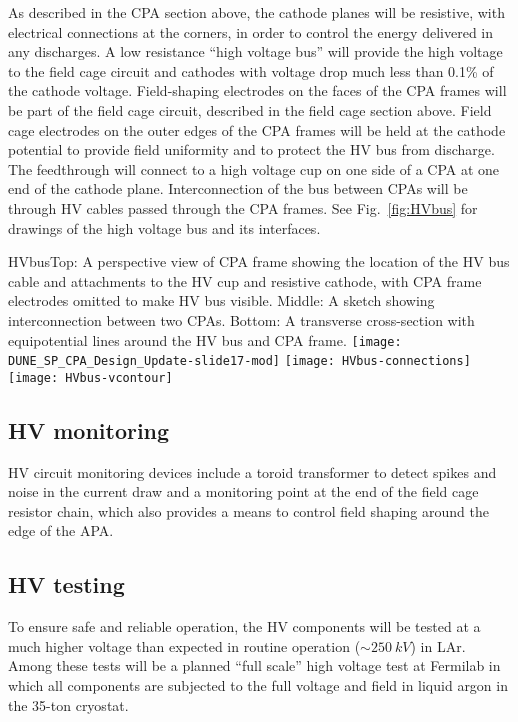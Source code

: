 As described in the CPA section above, the cathode planes will be
resistive, with electrical connections at the corners, in order to
control the energy delivered in any discharges.  A low resistance
``high voltage bus'' will provide the high voltage to the field cage
circuit and cathodes with voltage drop much less than 0.1\% of the
cathode voltage.  Field-shaping electrodes on the faces of the CPA
frames will be part of the field cage circuit, described in the field
cage section above. Field cage electrodes on the outer edges of the
CPA frames will be held at the cathode potential to provide field
uniformity and to protect the HV bus from discharge.  The feedthrough
will connect to a high voltage cup on one side of a CPA at one end of
the cathode plane.  Interconnection of the bus between CPAs will be
through HV cables passed through the CPA frames.  See
Fig.~\ref{fig:HVbus} for drawings of the high voltage bus and its
interfaces.

\begin{cdrfigure}{HVbus}{Top: A perspective view of CPA frame showing the location of the HV bus cable and attachments to the HV cup and resistive cathode, with CPA frame electrodes omitted to make HV bus visible. Middle: A sketch showing interconnection between two CPAs. Bottom: A transverse cross-section with equipotential lines around the HV bus and CPA frame.}
\texttt{[image: DUNE\_SP\_CPA\_Design\_Update-slide17-mod]}
\texttt{[image: HVbus-connections]}
\texttt{[image: HVbus-vcontour]}
\end{cdrfigure}

\subsection{HV monitoring}

HV circuit monitoring devices include a toroid transformer to detect
spikes and noise in the current draw and a monitoring point at the end
of the field cage resistor chain, which also provides a means to
control field shaping around the edge of the
APA.

\subsection{HV testing}

To ensure safe and reliable operation, the HV components will be
tested at a much higher voltage than expected in routine operation
($\sim\SI{250}{kV}$) in LAr. Among these tests will be a planned
``full scale'' high voltage test at Fermilab in which all components
are subjected to the full voltage and field in liquid argon in the
35-ton cryostat.


